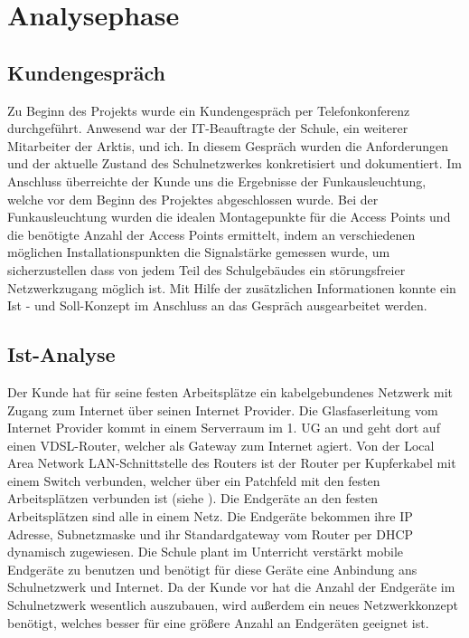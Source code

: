 \section{Analysephase} 
\label{sec:Analysephase}

\subsection{Kundengespräch}
\label{sec:Kundengespräch}
Zu Beginn des Projekts wurde ein Kundengespräch per Telefonkonferenz durchgeführt. Anwesend war der IT-Beauftragte der Schule, ein weiterer Mitarbeiter der Arktis, und ich. In diesem Gespräch wurden die Anforderungen und der aktuelle Zustand des Schulnetzwerkes konkretisiert und dokumentiert. Im Anschluss überreichte der Kunde uns die Ergebnisse der Funkausleuchtung, welche vor dem Beginn des Projektes abgeschlossen wurde. Bei der Funkausleuchtung wurden die idealen Montagepunkte für die Access Points  und die benötigte Anzahl der Access Points ermittelt, indem an verschiedenen möglichen Installationspunkten die Signalstärke gemessen wurde, um sicherzustellen dass von jedem Teil des Schulgebäudes ein störungsfreier Netzwerkzugang möglich ist. Mit Hilfe der zusätzlichen Informationen konnte ein Ist - und Soll-Konzept im Anschluss an das Gespräch ausgearbeitet werden. 

\subsection{Ist-Analyse} 
\label{sec:IstAnalyse}
Der Kunde hat für seine festen Arbeitsplätze ein kabelgebundenes Netzwerk mit Zugang zum Internet über seinen Internet Provider. 
Die Glasfaserleitung vom Internet Provider kommt in einem Serverraum im 1. \ac{UG} an und geht dort auf einen \ac{VDSL}-Router, welcher als Gateway zum Internet agiert. Von der Local Area Network \ac{LAN}-Schnittstelle des Routers ist der Router per Kupferkabel mit einem Switch verbunden, welcher über ein Patchfeld mit den festen Arbeitsplätzen verbunden ist (siehe ). Die Endgeräte an den festen Arbeitsplätzen sind alle in einem Netz. Die Endgeräte bekommen ihre IP Adresse, Subnetzmaske und ihr Standardgateway vom Router per \ac{DHCP} dynamisch zugewiesen. Die Schule plant im Unterricht verstärkt mobile Endgeräte zu benutzen und benötigt für diese Geräte eine Anbindung ans Schulnetzwerk und Internet. Da der Kunde vor hat die Anzahl der Endgeräte im Schulnetzwerk wesentlich auszubauen, wird außerdem ein neues Netzwerkkonzept benötigt, welches besser für eine größere Anzahl an Endgeräten geeignet ist. 


